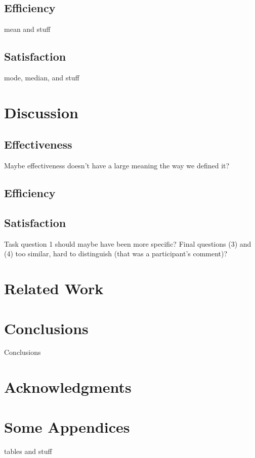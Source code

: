 \documentclass{sig-alternate-05-2015}
\begin{document}
\subsection{Efficiency}
mean and stuff
\subsection{Satisfaction}
mode, median, and stuff
\section{Discussion}
\subsection{Effectiveness}
Maybe effectiveness doesn't have a large meaning the way we defined it? 
\subsection{Efficiency}
\subsection{Satisfaction}
Task question 1 should maybe have been more specific? Final questions (3) and (4) too similar, hard to distinguish (that was a participant's comment)?
\section{Related Work}
\section{Conclusions}
Conclusions

\section{Acknowledgments}

%

%
%
\appendix
\section{Some Appendices}
tables and stuff
\end{document}

